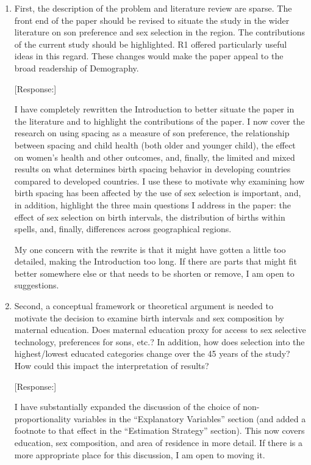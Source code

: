 \documentclass[letterpaper,12pt]{article}
\begin{document}
\begin{enumerate}

\item First, the description of the problem and literature review are sparse.
The front end of the paper should be revised to situate the study in the
wider literature on son preference and sex selection in the region. The
contributions of the current study should be highlighted. R1 offered
particularly useful ideas in this regard. These changes would make the
paper appeal to the broad readership of Demography.

[Response:]

I have completely rewritten the Introduction to better situate the paper in the literature
and to highlight the contributions of the paper.
I now cover the research on using spacing as a measure of son preference, the 
relationship between spacing and child health (both older and younger child), the 
effect on women's health and other outcomes, and, finally, the limited and mixed results
on what determines birth spacing behavior in developing countries compared to developed 
countries.
I use these to motivate why examining how birth spacing has been affected by the use of
sex selection is important, and, in addition, highlight the three main questions I address 
in the paper: the effect of sex selection on birth intervals, the distribution of births 
within spells, and, finally, differences across geographical regions.

My one concern with the rewrite is that it might have gotten a little too detailed,
making the Introduction too long. 
If there are parts that might fit better somewhere else or that needs to be shorten or
remove, I am open to suggestions.

\item Second, a conceptual framework or theoretical argument is needed to
motivate the decision to examine birth intervals and sex composition by
maternal education. Does maternal education proxy for access to sex
selective technology, preferences for sons, etc.? 
In addition, how does
selection into the highest/lowest educated categories change over the 45
years of the study? How could this impact the interpretation of results?

[Response:]

I have substantially expanded the discussion of the choice of non-proportionality 
variables in the ``Explanatory Variables'' section (and added a footnote to that effect 
in the ``Estimation Strategy'' section).
This now covers education, sex composition, and area of residence in more detail.
If there is a more appropriate place for this discussion, I am open to moving it.


\end{enumerate}
\end{document}
